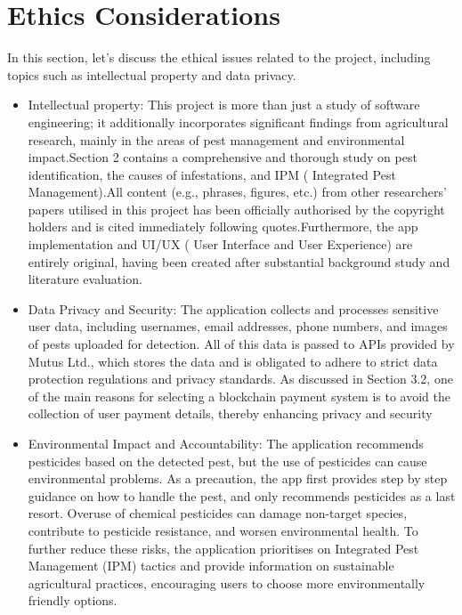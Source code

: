 \section{Ethics Considerations}
In this section, let's discuss the ethical issues related to the project, including topics such as intellectual property and data privacy.
\begin{itemize}
    \item Intellectual property: This project is more than just a study of software engineering; it additionally incorporates significant findings from agricultural research, mainly in the areas of pest management and environmental impact.Section 2 contains a comprehensive and thorough study on pest identification, the causes of infestations, and IPM ( Integrated Pest Management).All content (e.g., phrases, figures, etc.) from other researchers' papers utilised in this project has been officially authorised by the copyright holders and is cited immediately following quotes.Furthermore, the app implementation and UI/UX ( User Interface and User Experience) are entirely original, having been created after substantial background study and literature evaluation.
    \item Data Privacy and Security: The application collects and processes sensitive user data, including usernames, email addresses, phone numbers, and images of pests uploaded for detection. All of this data is passed to APIs provided by Mutus Ltd., which stores the data and is obligated to adhere to strict data protection regulations and privacy standards.
    As discussed in Section 3.2, one of the main reasons for selecting a blockchain payment system is to avoid the collection of user payment details, thereby enhancing privacy and security
    \item Environmental Impact and Accountability: The application recommends pesticides based on the detected pest, but the use of pesticides can cause environmental problems. As a precaution, the app first provides step by step guidance on how to handle the pest, and only recommends pesticides as a last resort. Overuse of chemical pesticides can damage non-target species, contribute to pesticide resistance, and worsen environmental health. To further reduce these risks, the application prioritises on Integrated Pest Management (IPM) tactics and provide information on sustainable agricultural practices, encouraging users to choose more environmentally friendly options. 
\end{itemize}

